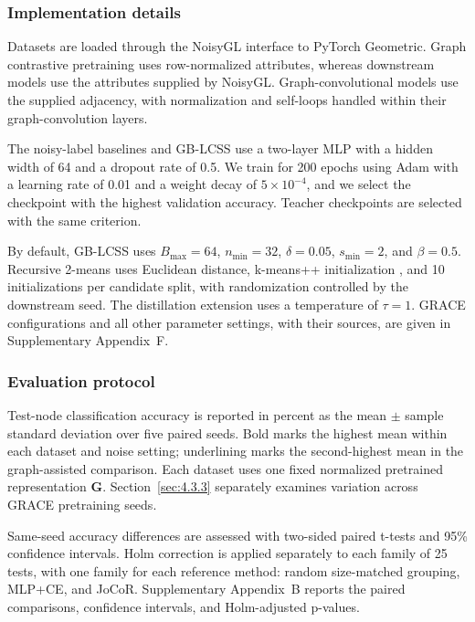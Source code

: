 \documentclass[times,review,10pt]{elsarticle}
\theoremstyle{definition}
\theoremstyle{plain}
\begin{document}
\subsubsection{Implementation details}\label{sec:4.1.4}

Datasets are loaded through the NoisyGL interface to PyTorch Geometric. Graph contrastive pretraining uses row-normalized attributes, whereas downstream models use the attributes supplied by NoisyGL. Graph-convolutional models use the supplied adjacency, with normalization and self-loops handled within their graph-convolution layers.

The noisy-label baselines and GB-LCSS use a two-layer MLP with a hidden width of 64 and a dropout rate of 0.5. We train for 200 epochs using Adam with a learning rate of 0.01 and a weight decay of \(5 \times 10^{- 4}\), and we select the checkpoint with the highest validation accuracy. Teacher checkpoints are selected with the same criterion.

By default, GB-LCSS uses \(B_{\max} = 64\), \(n_{\min} = 32\), \(\delta = 0.05\), \(s_{\min} = 2\), and \(\beta = 0.5\). Recursive 2-means uses Euclidean distance, k-means++ initialization \cite{ref71}, and 10 initializations per candidate split, with randomization controlled by the downstream seed. The distillation extension uses a temperature of \(\tau = 1\). GRACE configurations and all other parameter settings, with their sources, are given in Supplementary Appendix~F.

\subsubsection{Evaluation protocol}\label{sec:4.1.5}

Test-node classification accuracy is reported in percent as the mean \ensuremath{\pm} sample standard deviation over five paired seeds. Bold marks the highest mean within each dataset and noise setting; underlining marks the second-highest mean in the graph-assisted comparison. Each dataset uses one fixed normalized pretrained representation \(\mathbf G\). Section~\ref{sec:4.3.3} separately examines variation across GRACE pretraining seeds.

Same-seed accuracy differences are assessed with two-sided paired t-tests and 95\% confidence intervals. Holm correction \cite{ref72} is applied separately to each family of 25 tests, with one family for each reference method: random size-matched grouping, MLP+CE, and JoCoR. Supplementary Appendix~B reports the paired comparisons, confidence intervals, and Holm-adjusted p-values.
\end{document}
